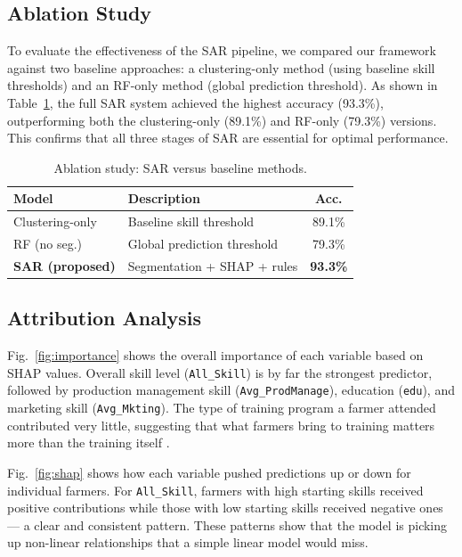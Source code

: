 \documentclass[fleqn,10pt,lineno]{wlpeerj}
\begin{document}
\subsection{Ablation Study}
To evaluate the effectiveness of the SAR pipeline, we compared our framework against two baseline approaches: 
a clustering-only method (using baseline skill thresholds) and an RF-only method (global prediction threshold). 
As shown in Table~\ref{tab:ablation}, the full SAR system achieved the highest accuracy (93.3\%),
 outperforming both the clustering-only (89.1\%) and RF-only (79.3\%) versions. 
 This confirms that all three stages of SAR are essential for optimal performance.

\begin{table}[htbp]
\centering
\caption{Ablation study: SAR versus baseline methods.}
\label{tab:ablation}
\begin{tabular}{@{}llc@{}}
\toprule
\textbf{Model} & \textbf{Description} & \textbf{Acc.} \\
\midrule
Clustering-only & Baseline skill threshold & 89.1\% \\
RF (no seg.) & Global prediction threshold & 79.3\% \\
\textbf{SAR (proposed)} & Segmentation + SHAP + rules & \textbf{93.3\%} \\
\bottomrule
\end{tabular}
\end{table}

\subsection{Attribution Analysis}

Fig.~\ref{fig:importance} shows the overall importance of each 
variable based on SHAP values. Overall skill level 
(\texttt{All\_Skill}) is by far the strongest predictor, followed 
by production management skill (\texttt{Avg\_ProdManage}), 
education (\texttt{edu}), and marketing skill (\texttt{Avg\_Mkting}). 
The type of training program a farmer attended contributed very 
little, suggesting that what farmers bring to training matters more 
than the training itself \citep{ryo2022}.

Fig.~\ref{fig:shap} shows how each variable pushed predictions up 
or down for individual farmers. For \texttt{All\_Skill}, farmers 
with high starting skills received positive contributions while 
those with low starting skills received negative ones — a clear 
and consistent pattern. These patterns show that the model is 
picking up non-linear relationships that a simple linear model 
would miss.
\end{document}
